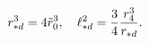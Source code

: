 \begin{equation}
r^{3}_{*d}=4\tilde{r}^{3}_{0},\quad
\ell^{2}_{*d}={3\over 4}{r_{4}^{3}\over r_{*d}}.
\label{eq:rastdec}
\end{equation}

